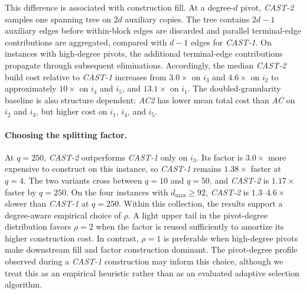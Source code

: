\documentclass{article}
\newcommand{\CASTone}{\textit{CAST-1}\xspace}
\newcommand{\CASTtwo}{\textit{CAST-2}\xspace}
\newcommand{\AC}{\textit{AC}\xspace}
\newcommand{\ACtwo}{\textit{AC2}\xspace}
\newcommand{\1}{\mathbbm{1}}
\theoremstyle{plain}
\begin{document}
This difference is associated with construction fill. At a degree-$d$
pivot, \CASTtwo samples one spanning tree on $2d$ auxiliary copies.
The tree contains $2d-1$ auxiliary edges before within-block edges
are discarded and parallel terminal-edge contributions are
aggregated, compared with $d-1$ edges for \CASTone. On instances
with high-degree pivots, the additional terminal-edge contributions
propagate through subsequent eliminations. Accordingly, the median \CASTtwo build cost relative to \CASTone
increases from $3.0\times$ on $i_3$ and $4.6\times$ on $i_2$ to
approximately $10\times$ on $i_4$ and $i_5$, and $13.1\times$ on
$i_1$. The doubled-granularity baseline is also structure dependent:
\ACtwo has lower mean total cost than \AC on $i_2$ and $i_3$, but
higher cost on $i_1$, $i_4$, and $i_5$.

\paragraph{Choosing the splitting factor.}
At $q=250$, \CASTtwo outperforms \CASTone only on $i_3$. Its factor
is $3.0\times$ more expensive to construct on this instance, so
\CASTone remains $1.38\times$ faster at $q=4$. The two variants
cross between $q=10$ and $q=50$, and \CASTtwo is $1.17\times$
faster by $q=250$. On the four instances with
$d_{\max}\geq92$, \CASTtwo is $1.3$--$4.6\times$ slower than
\CASTone at $q=250$. Within this collection, the results support a degree-aware empirical
choice of $\rho$. A light upper tail in the pivot-degree distribution
favors $\rho=2$ when the factor is reused sufficiently to amortize
its higher construction cost. In contrast, $\rho=1$ is preferable
when high-degree pivots make downstream fill and factor construction
dominant. The pivot-degree profile observed during a \CASTone
construction may inform this choice, although we treat this as an
empirical heuristic rather than as an evaluated adaptive selection
algorithm.

\end{document}
